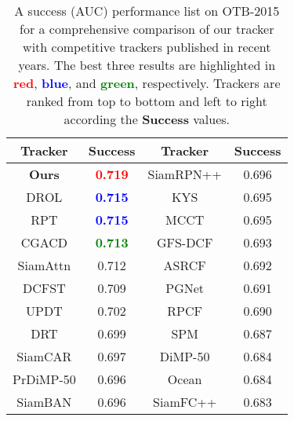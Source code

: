 \documentclass[final]{cvpr}
\begin{document}
\begin{table}[!tbp]
 \centering
 \caption{\label{tab:otb2015_tab}A success (AUC) performance list on OTB-2015 for a comprehensive comparison of our tracker with competitive trackers published in recent years. The best three results are highlighted in \textcolor{red}{\textbf{red}}, \textcolor{blue}{\textbf{blue}}, and \textcolor{green}{\textbf{green}}, respectively. Trackers are ranked from top to bottom and left to right according the \textbf{Success} values.}
 \vspace{-1.0em}
 \begin{tabular}{cc|cc}
  \toprule
  \textbf{Tracker} & \textbf{Success} & \textbf{Tracker} & \textbf{Success} \\
  \midrule
  \textbf{Ours} & \textcolor{red}{\textbf{0.719}} & SiamRPN++ \cite{li2019siamrpn++} & 0.696 \\
  DROL \cite{zhou2020discriminative} & \textcolor{blue}{\textbf{0.715}} & KYS \cite{bhat2020know} & 0.695 \\
  RPT \cite{ma2020rpt} & \textcolor{blue}{\textbf{0.715}} & MCCT \cite{wang2018multi} & 0.695 \\
  CGACD \cite{du2020correlation} & \textcolor{green}{\textbf{0.713}} & GFS-DCF \cite{xu2019joint} & 0.693 \\
  SiamAttn \cite{yu2020deformable} & 0.712 & ASRCF \cite{dai2019visual} & 0.692 \\
  DCFST \cite{zhenglearning} & 0.709 & PGNet \cite{liaopg} & 0.691 \\
  UPDT \cite{bhat2018unveiling} & 0.702 & RPCF \cite{sun2019roi} & 0.690 \\
  DRT \cite{sun2018correlation} & 0.699 & SPM \cite{wang2019spm} & 0.687 \\
  SiamCAR \cite{guo2020siamcar} & 0.697 & DiMP-50 \cite{bhat2019learning} & 0.684 \\
  PrDiMP-50 \cite{danelljan2020probabilistic} & 0.696 & Ocean \cite{zhang2020ocean} & 0.684 \\
  SiamBAN \cite{chen2020siamese} & 0.696 & SiamFC++ \cite{xu2020siamfc++} & 0.683 \\
  \bottomrule
 \end{tabular}
\end{table}
\end{document}

